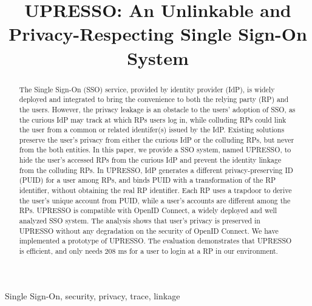\documentclass[conference, 10pt]{IEEEtran}
\begin{document}
\title{{UPRESSO}: An Unlinkable and Privacy-Respecting Single Sign-On System}
%
\maketitle
\begin{abstract}
 The Single Sign-On (SSO) service, provided by identity provider (IdP),  is widely deployed and integrated to bring the convenience to both the relying party (RP) and the users.
 However, the privacy leakage is an obstacle to the users' adoption of SSO, 
 as the curious IdP may track at which RPs users log in,
while colluding RPs could link the user from a common or related identifer(s) issued by the IdP.
 Existing solutions preserve the user's privacy  from either the curious IdP or the colluding RPs, but never from the both entities. 
In this paper, we provide a SSO system, named UPRESSO, to hide the user's accessed RPs from the curious IdP 
and prevent the identity linkage from the colluding RPs. 
In UPRESSO, IdP generates a different privacy-preserving ID (PUID) for a user among RPs, and binds PUID with a transformation of the RP identifier, without obtaining the real RP identifier.
Each RP uses a trapdoor to derive the user's unique account from PUID, 
while a user's accounts are different among the RPs.
UPRESSO  is compatible with OpenID Connect, a widely deployed and well analyzed SSO system. 
The analysis shows that user's privacy is preserved in UPRESSO without any degradation on the security of OpenID Connect.
We have implemented a prototype of UPRESSO. The evaluation demonstrates that UPRESSO is efficient, and only needs 208 ms for a user to login at a RP in our environment.
\end{abstract}
\begin{IEEEkeywords}
Single Sign-On, security, privacy, trace, linkage
\end{IEEEkeywords}















\end{document}
